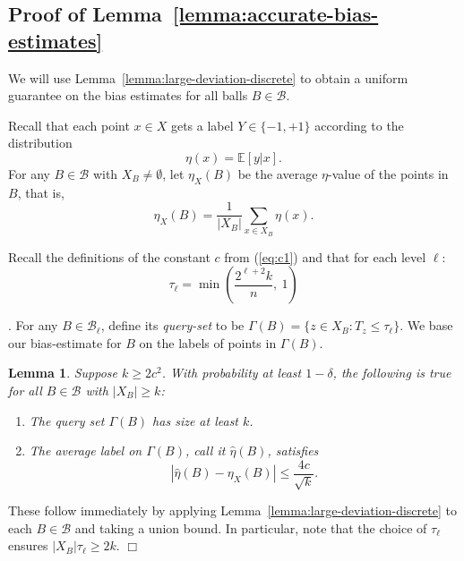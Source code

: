 \documentclass{article}
\def\E{{\mathbb E}}
\def\B{{\mathcal B}}
\newtheorem{lemma}[thm]{Lemma}
\newenvironment{proof}{\noindent {\sc Proof:}}{$\Box$ \medskip}
\begin{document}
\subsection{Proof of Lemma~\ref{lemma:accurate-bias-estimates}}

We will use Lemma~\ref{lemma:large-deviation-discrete} to obtain a uniform guarantee on the bias estimates for all balls $B \in \B$.

Recall that each point $x \in X$ gets a label $Y \in \{-1,+1\}$ according to the distribution
$$ \eta(x) = \E[y | x].$$ 
For any $B \in \B$ with $X_B \neq \emptyset$, let $\eta_X(B)$ be the average $\eta$-value of the points in $B$, that is,
$$ \eta_X(B) = \frac{1}{|X_B|} \sum_{x \in X_B} \eta(x) .$$

Recall the definitions of the constant $c$ from (\ref{eq:c1}) and that for each level $\ell$:
\begin{equation}
\tau_\ell = \min \left( \frac{2^{\ell+2}k}{n}, \ 1 \right)
\label{eq:threshold-ell}
\end{equation}


. For any $B \in \B_\ell$, define its \emph{query-set} to be $\Gamma(B) = \{z \in X_B: T_z \leq \tau_\ell\}$. We base our bias-estimate for $B$ on the labels of points in $\Gamma(B)$.

\begin{lemma}
Suppose $k \geq 2c^2$. With probability at least $1-\delta$, the following is true for all $B \in \B$ with $|X_B| \geq k$:
\begin{enumerate}
\item[(a)] The query set $\Gamma(B)$ has size at least $k$.
\item[(b)] The average label on $\Gamma(B)$, call it $\widehat{\eta}(B)$, satisfies
$$ \left| \widehat{\eta}(B) - \eta_X(B) \right| \leq \frac{4c}{\sqrt{k}}.$$
\end{enumerate}
\label{lemma:large-deviation-bounds}
\end{lemma}
\begin{proof}
These follow immediately by applying Lemma~\ref{lemma:large-deviation-discrete} to each $B \in \B$ and taking a union bound. In particular, note that the choice of $\tau_\ell$ ensures $|X_B| \tau_\ell \geq 2k$.
\end{proof}
\end{document}
